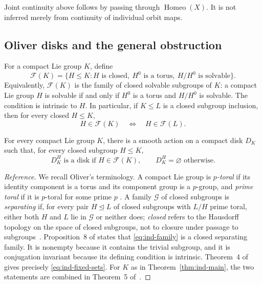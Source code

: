 \begin{remark}\label{rem:ind-remark-1}
Joint continuity above follows by passing through $\operatorname{Homeo}(X)$.
It is not inferred merely from continuity of individual orbit maps.
\end{remark}


\subsection{Oliver disks and the general obstruction}\label{sec:ind-oliver}

For a compact Lie group $K$, define
\begin{equation}\label{eq:ind-family}
\mathcal F(K)=\{H\le K:H\text{ is closed},\ H^0\text{ is a torus},
\ H/H^0\text{ is solvable}\}.
\end{equation}
Equivalently, $\mathcal F(K)$ is the family of closed solvable subgroups of
$K$: a compact Lie group $H$ is solvable if and only if $H^0$ is a torus
and $H/H^0$ is solvable. The condition is intrinsic to $H$. In
particular, if $K\le L$ is a closed subgroup inclusion, then for every
closed $H\le K$,
\begin{equation}\label{eq:ind-intrinsic}
H\in\mathcal F(K)\quad\Longleftrightarrow\quad H\in\mathcal F(L).
\end{equation}

\begin{theorem}[Oliver]\label{thm:ind-oliver}
For every compact Lie group $K$, there is a smooth action on a compact
disk $D_K$ such that, for every closed subgroup $H\le K$,
\begin{equation}\label{eq:ind-fixed-sets}
D_K^H\text{ is a disk if }H\in\mathcal F(K),
\qquad D_K^H=\varnothing\text{ otherwise}.
\end{equation}
\end{theorem}

\begin{proof}[Reference]
We recall Oliver's terminology. A compact Lie group is \emph{$p$-toral}
if its identity component is a torus and its component group is a
$p$-group, and \emph{prime toral} if it is $p$-toral for some prime $p$
\cite[p.~80]{Oliver1976}. A family $\mathcal G$ of closed subgroups is
\emph{separating} if, for every pair $H\trianglelefteq L$ of closed
subgroups with $L/H$ prime toral, either both $H$ and $L$ lie in
$\mathcal G$ or neither does; \emph{closed} refers to the Hausdorff
topology on the space of closed subgroups, not to closure under passage
to subgroups~\cite[pp.~92--93]{Oliver1976}. Proposition~8 of
\cite[p.~95]{Oliver1976} states that \eqref{eq:ind-family} is a closed
separating family. It is nonempty because it contains the trivial
subgroup, and it is conjugation invariant because its defining condition
is intrinsic. Theorem~4 of~\cite[p.~94]{Oliver1976} gives precisely
\eqref{eq:ind-fixed-sets}. For $K$ as in Theorem~\ref{thm:ind-main}, the two
statements are combined in Theorem~5 of~\cite[p.~96]{Oliver1976}.
\end{proof}

